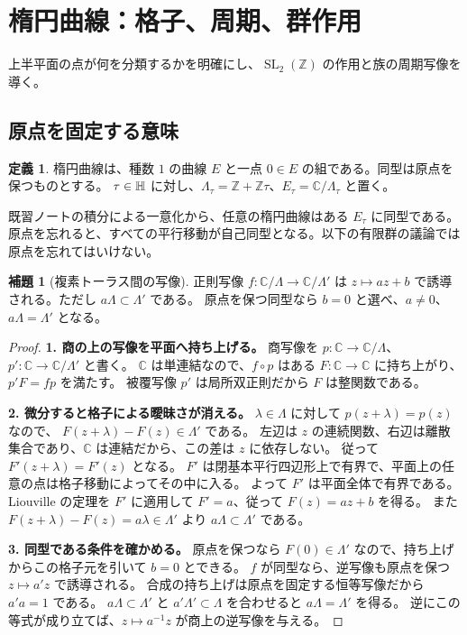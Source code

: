 \documentclass[dvipdfmx,a4paper,11pt]{article}
\theoremstyle{definition}
\newtheorem{lem}[thm]{補題}
\newtheorem{dfn}[thm]{定義}
\newenvironment{aim}{\begin{tcolorbox}[mybox,colback=green!3,title=この章で考えること,fonttitle=\bfseries]}{\end{tcolorbox}}
\newcommand{\C}{\mathbb C}\newcommand{\R}{\mathbb R}\newcommand{\Z}{\mathbb Z}\newcommand{\Q}{\mathbb Q}
\DeclareMathOperator{\SL}{SL}\DeclareMathOperator{\PGL}{PGL}\DeclareMathOperator{\PSL}{PSL}
\begin{document}
\par\bigskip\Needspace{.70\textheight}
\section{楕円曲線：格子、周期、群作用}\label{sec:elliptic}
\begin{aim}
上半平面の点が何を分類するかを明確にし、$\SL_2(\Z)$ の作用と族の周期写像を導く。
\end{aim}
\subsection{原点を固定する意味}
\begin{dfn}
楕円曲線は、種数 $1$ の曲線 $E$ と一点 $0\in E$ の組である。同型は原点を保つものとする。
$\tau\in\mathbb H$ に対し、$\Lambda_\tau=\Z+\Z\tau$、$E_\tau=\C/\Lambda_\tau$ と置く。
\end{dfn}
既習ノートの積分による一意化から、任意の楕円曲線はある $E_\tau$ に同型である。
原点を忘れると、すべての平行移動が自己同型となる。以下の有限群の議論では原点を忘れてはいけない。

\begin{lem}[複素トーラス間の写像]\label{lem:torusmap}
正則写像 $f:\C/\Lambda\to\C/\Lambda'$ は $z\mapsto az+b$ で誘導される。ただし $a\Lambda\subset\Lambda'$ である。
原点を保つ同型なら $b=0$ と選べ、$a\neq0$、$a\Lambda=\Lambda'$ となる。
\end{lem}
\begin{proof}
\textbf{1. 商の上の写像を平面へ持ち上げる。}
商写像を $p:\C\to\C/\Lambda$、$p':\C\to\C/\Lambda'$ と書く。
$\C$ は単連結なので、$f\circ p$ はある $F:\C\to\C$ に持ち上がり、$p'F=fp$ を満たす。
被覆写像 $p'$ は局所双正則だから $F$ は整関数である。

\textbf{2. 微分すると格子による曖昧さが消える。}
$\lambda\in\Lambda$ に対して $p(z+\lambda)=p(z)$ なので、
$F(z+\lambda)-F(z)\in\Lambda'$ である。
左辺は $z$ の連続関数、右辺は離散集合であり、$\C$ は連結だから、この差は $z$ に依存しない。
従って $F'(z+\lambda)=F'(z)$ となる。
$F'$ は閉基本平行四辺形上で有界で、平面上の任意の点は格子移動によってその中に入る。
よって $F'$ は平面全体で有界である。Liouville の定理を $F'$ に適用して $F'=a$、従って $F(z)=az+b$ を得る。
また $F(z+\lambda)-F(z)=a\lambda\in\Lambda'$ より $a\Lambda\subset\Lambda'$ である。

\textbf{3. 同型である条件を確かめる。}
原点を保つなら $F(0)\in\Lambda'$ なので、持ち上げからこの格子元を引いて $b=0$ とできる。
$f$ が同型なら、逆写像も原点を保つ $z\mapsto a'z$ で誘導される。
合成の持ち上げは原点を固定する恒等写像だから $a'a=1$ である。
$a\Lambda\subset\Lambda'$ と $a'\Lambda'\subset\Lambda$ を合わせると $a\Lambda=\Lambda'$ を得る。
逆にこの等式が成り立てば、$z\mapsto a^{-1}z$ が商上の逆写像を与える。
\end{proof}
\end{document}
